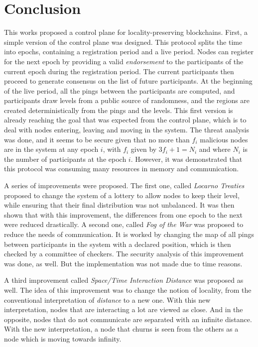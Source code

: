 \documentclass[a4paper,11pt,oneside]{report}
\begin{document}
\chapter{Conclusion} \label{chap:Conclusion} %


This works proposed a control plane for locality-preserving blockchains. First,
a simple version of the control plane was designed. This protocol splits the
time into epochs, containing a registration period and a live period. Nodes can
register for the next epoch by providing a valid \textit{endorsement} to the
participants of the current epoch during the registration period. The current
participants then proceed to generate consensus on the list of future
participants. At the beginning of the live period, all the pings between the
participants are computed, and participants draw levels from a public source of
randomness, and the regions are created deterministically from the pings and
the levels. This first version is already reaching the goal that was expected
from the control plane, which is to deal with nodes entering, leaving and
moving in the system. The threat analysis was done, and it seems to be secure
given that no more than $f_i$ malicious nodes are in the system at any epoch
$i$, with $f_i$ given by $3f_i+1=N_i$ and where $N_i$ is the number of
participants at the epoch $i$. However, it was demonstrated that this protocol
was consuming many resources in memory and communication. 

A series of improvements were proposed. The first one, called \textit{Locarno
Treaties} proposed to change the system of a lottery to allow nodes to keep
their level, while ensuring that their final distribution was not unbalanced.
It was then shown that with this improvement, the differences from one epoch to
the next were reduced drastically. A second one, called \textit{Fog of the War}
was proposed to reduce the needs of communication. It is worked by changing the
map of all pings between participants in the system with a declared position,
which is then checked by a committee of checkers. The security analysis of this
improvement was done, as well. But the implementation was not made due to time
reasons. 

A third improvement called \textit{Space/Time Interaction Distance} was
proposed as well. The idea of this improvement was to change the notion of
locality, from the conventional interpretation of \textit{distance} to a new one.
With this new interpretation, nodes that are interacting a lot are viewed as
close. And in the opposite, nodes that do not communicate are separated with an
infinite distance. With the new interpretation, a node that churns is seen from
the others as a node which is moving towards infinity.  
\end{document}

